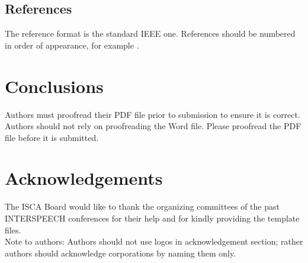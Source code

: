 \documentclass[a4paper]{article}
\begin{document}
	\subsection{References}
	
	The reference format is the standard IEEE one. References should be numbered in order of appearance, for example \cite{Davis80-COP}.
	
	\section{Conclusions}
	
	Authors must proofread their PDF file prior to submission to ensure it is correct. Authors should not rely on proofreading the Word file. Please proofread the PDF file before it is submitted.
	
	\section{Acknowledgements}
	
	The ISCA Board would like to thank the organizing committees of the past INTERSPEECH conferences for their help and for kindly providing the template files. \\
	Note to authors: Authors should not use logos in acknowledgement section; rather authors should acknowledge corporations by naming them only.
	
	
	
	
	
	
	
\end{document}
